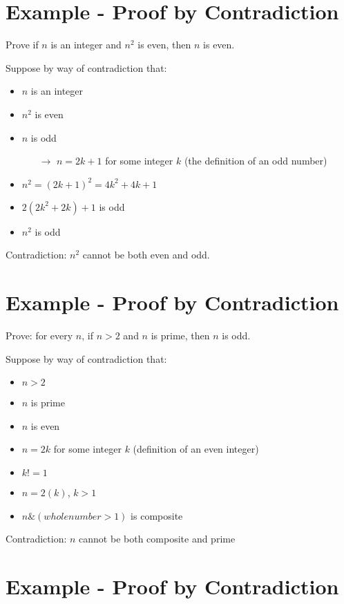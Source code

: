 \documentclass[12pt]{article}
\begin{document}
\section*{Example - Proof by Contradiction}

Prove if $n$ is an integer and $n^2$ is even, then $n$ is even.

Suppose by way of contradiction that: 
\begin{itemize}
    \item $n$ is an integer
    \item $n^2$ is even 
    \item $n$ is odd
    \begin{itemize}
        \item[$\rightarrow$] $n = 2k+1$ for some integer $k$ (the definition of an odd number)
    \end{itemize}
    \item $n^2 = (2k+1)^2 = 4k^2 + 4k + 1$
    \item $2(2k^2+2k) + 1$ is odd
    \item $n^2$ is odd
\end{itemize}

Contradiction: $n^2$ cannot be both even and odd.

\section*{Example - Proof by Contradiction}

Prove: for every $n$, if $n > 2$ and $n$ is prime, then $n$ is odd.

Suppose by way of contradiction that:
\begin{itemize}
    \item $n>2$
    \item $n$ is prime
    \item $n$ is even
    \item $n = 2k$ for some integer $k$ (definition of an even integer) 
    \item $k != 1$
    \item $n = 2(k)$, $k>1$
    \item $n \& (whole number > 1)$ is composite
\end{itemize}

Contradiction: $n$ cannot be both composite and prime


\section*{Example - Proof by Contradiction}
\end{document}
